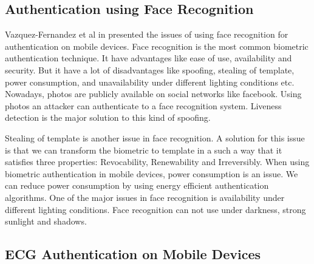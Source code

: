 \documentclass[10pt,a4paper,journal]{IEEEtran}
\begin{document}
\subsection{Authentication using Face Recognition}

\hspace{2em} Vazquez-Fernandez et al in \cite{1}presented the issues of using face recognition for authentication on mobile devices. Face recognition is the most common biometric authentication technique. It have advantages like ease of use, availability and security. But it have a lot of disadvantages like spoofing, stealing of template, power consumption, and unavailability under different lighting conditions etc. Nowadays, photos are publicly available on social networks like facebook. Using photos an attacker can authenticate to a face recognition system. Liveness detection is the major solution to this kind of spoofing.

\hspace{2em} Stealing of template is another issue in face recognition. A solution for this issue is that we can transform the biometric to template in a such a way that it satisfies three properties: Revocability, Renewability and Irreversibly. When using biometric authentication in mobile devices, power consumption is an issue. We can reduce power consumption by using energy efficient authentication algorithms\cite{2}. One of the major issues in face recognition is availability under different lighting conditions. Face recognition can not use under darkness, strong sunlight and shadows.

\subsection{ECG Authentication on Mobile Devices}
\end{document}
